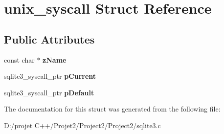 \hypertarget{structunix__syscall}{}\section{unix\+\_\+syscall Struct Reference}
\label{structunix__syscall}
\subsection*{Public Attributes}
\begin{DoxyCompactItemize}
\item 
\mbox{\label{structunix__syscall_aaf85c3771782bac6dc0c0c225bb93337}} 
const char $\ast$ {\bfseries z\+Name}
\item 
\mbox{\label{structunix__syscall_a7d6c32f755f68afe76629302b372f438}} 
sqlite3\+\_\+syscall\+\_\+ptr {\bfseries p\+Current}
\item 
\mbox{\label{structunix__syscall_a203d8ab871b9baf8326eddf31cd0c954}} 
sqlite3\+\_\+syscall\+\_\+ptr {\bfseries p\+Default}
\end{DoxyCompactItemize}


The documentation for this struct was generated from the following file\+:\begin{DoxyCompactItemize}
\item 
D\+:/projet C++/\+Projet2/\+Project2/\+Project2/sqlite3.\+c\end{DoxyCompactItemize}

